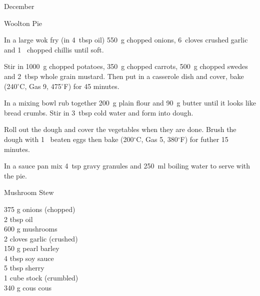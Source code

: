 \begin{menu}{December}
\begin{recipe}{2}{Woolton Pie}
    \begin{instructions}
    \item 
        In a large wok fry
        (in 4~tbsp  oil)
        550~g chopped onions,
        6~cloves crushed garlic
        and
        1~ chopped chillis
        until soft.
      \item 
        Stir in
        1000~g chopped potatoes,
        350~g chopped carrots,
        500~g chopped swedes
        and
        2~tbsp  whole grain mustard.
        Then put in a casserole dish and cover,
        bake (240$^{\circ}$C, Gas 9, 475$^{\circ}$F) for 45 minutes.
      \item 
        In a mixing bowl
        rub together
        200~g  plain flour
        and
        90~g  butter
        until it looks like bread crumbs.
        Stir in
        3~tbsp  cold water
        and form into dough.
      \item 
        Roll out the dough and cover the vegetables when they are done.
        Brush the dough with 1~ beaten eggs
        then bake (200$^{\circ}$C, Gas 5, 380$^{\circ}$F) for futher 15 minutes.
      \item 
        In a sauce pan mix
        4~tsp  gravy granules
        and
        250~ml  boiling water
        to serve with the pie.
      
    \end{instructions}
    \end{recipe}%
  
    \begin{recipe}{2}{Mushroom Stew}%
		\begin{ingredients}
		375 g onions (chopped) \\
	2 tbsp oil  \\
	600 g mushrooms  \\
	2 cloves garlic (crushed) \\
	150 g pearl barley  \\
	4 tbsp soy sauce  \\
	5 tbsp sherry  \\
	1 cube stock (crumbled) \\
	340 g cous cous  \\
	
		\end{ingredients}
	
	

\end{recipe}
\end{menu}
